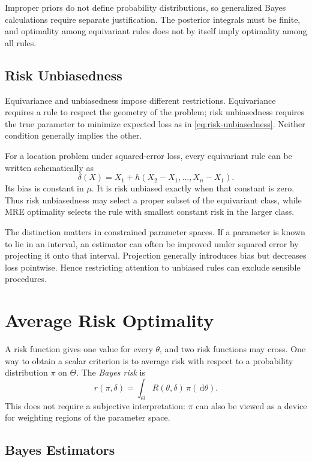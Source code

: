 \documentclass[12pt,oneside]{book}
\numberwithin{equation}{section}
\theoremstyle{definition}
\theoremstyle{plain}
\theoremstyle{remark}
\newcommand{\dd}{\,\mathrm{d}}
\begin{document}
Improper priors do not define probability distributions, so generalized
Bayes calculations require separate justification.  The posterior integrals
must be finite, and optimality among equivariant rules does not by itself
imply optimality among all rules.

\subsection{Risk Unbiasedness}

Equivariance and unbiasedness impose different restrictions.  Equivariance
requires a rule to respect the geometry of the problem; risk unbiasedness
requires the true parameter to minimize expected loss as in
\eqref{eq:risk-unbiasedness}.  Neither condition generally implies the other.

For a location problem under squared-error loss, every equivariant rule can
be written schematically as
\[
    \delta(X)=X_1+h(X_2-X_1,\ldots,X_n-X_1).
\]
Its bias is constant in $\mu$.  It is risk unbiased exactly when that constant
is zero.  Thus risk unbiasedness may select a proper subset of the equivariant
class, while MRE optimality selects the rule with smallest constant risk in
the larger class.

The distinction matters in constrained parameter spaces.  If a parameter is
known to lie in an interval, an estimator can often be improved under squared
error by projecting it onto that interval.  Projection generally introduces
bias but decreases loss pointwise.  Hence restricting attention to unbiased
rules can exclude sensible procedures.

\section{Average Risk Optimality}

A risk function gives one value for every $\theta$, and two risk functions may
cross.  One way to obtain a scalar criterion is to average risk with respect
to a probability distribution $\pi$ on $\Theta$.  The \emph{Bayes risk} is
\begin{equation}
    r(\pi,\delta)=\int_\Theta R(\theta,\delta)\,\pi(\dd\theta).
    \label{eq:bayes-risk}
\end{equation}
This does not require a subjective interpretation: $\pi$ can also be viewed
as a device for weighting regions of the parameter space.

\subsection{Bayes Estimators}
\end{document}
